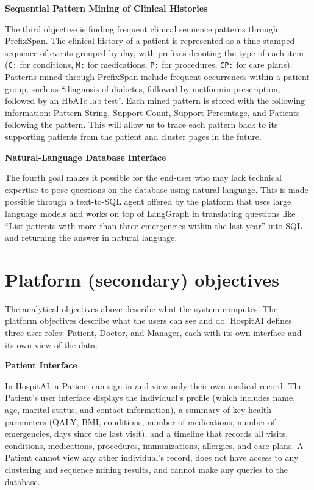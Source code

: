 \vspace{0.5em}
\noindent\textbf{Sequential Pattern Mining of Clinical Histories}

The third objective is finding frequent clinical sequence patterns through PrefixSpan. The clinical history of a patient is represented as a time-stamped sequence of events grouped by day, with prefixes denoting the type of each item (\texttt{C:} for conditions, \texttt{M:} for medications, \texttt{P:} for procedures, \texttt{CP:} for care plans). Patterns mined through PrefixSpan include frequent occurrences within a patient group, such as ``diagnosis of diabetes, followed by metformin prescription, followed by an HbA1c lab test''. Each mined pattern is stored with the following information: Pattern String, Support Count, Support Percentage, and Patients following the pattern. This will allow us to trace each pattern back to its supporting patients from the patient and cluster pages in the future.

\vspace{0.5em}
\noindent\textbf{Natural-Language Database Interface}

The fourth goal makes it possible for the end-user who may lack technical expertise to pose questions on the database using natural language. This is made possible through a text-to-SQL agent offered by the platform that uses large language models and works on top of LangGraph in translating questions like ``List patients with more than three emergencies within the last year'' into SQL and returning the answer in natural language.

\section{Platform (secondary) objectives}

The analytical objectives above describe what the system computes. The platform objectives describe what the users can see and do. HospitAI defines three user roles: Patient, Doctor, and Manager, each with its own interface and its own view of the data.

\vspace{0.5em}
\noindent\textbf{Patient Interface}

In HospitAI, a Patient can sign in and view only their own medical record. The Patient's user interface displays the individual's profile (which includes name, age, marital status, and contact information), a summary of key health parameters (QALY, BMI, conditions, number of medications, number of emergencies, days since the last visit), and a timeline that records all visits, conditions, medications, procedures, immunizations, allergies, and care plans. A Patient cannot view any other individual's record, does not have access to any clustering and sequence mining results, and cannot make any queries to the database.

